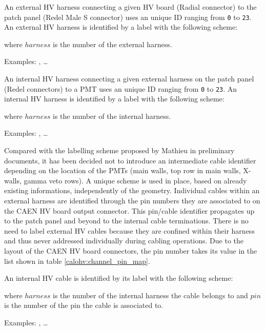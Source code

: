 \vskip 10pt An external HV harness connecting a given HV board (Radial
connector) to the patch panel (Redel  Male S connector) uses an unique
ID ranging from  \texttt{0} to \texttt{23}.  An external  HV harness is
identified by a label with the following scheme:
\begin{center}
 \end{center}
where \texttt{$harness$} is the number of the external harness.
\par\noindent Examples: , \dots
{}

\vskip 10pt An internal HV harness connecting a given external harness
on  the patch  panel (Redel  connectors) to  a PMT  uses an  unique ID
ranging from  \texttt{0} to  \texttt{23}.  An  internal HV  harness is
identified by a label with the following scheme:
\begin{center}
 \end{center}
where  \texttt{$harness$}  is  the  number of  the  internal  harness.
\par\noindent        Examples:       ,        \dots
{}

\vskip 10pt Compared with the  labelling scheme proposed by Mathieu in
preliminary  documents,  it  has  been decided  not  to  introduce  an
intermediate cable  identifier depending on  the location of  the PMTs
(main walls,  top row  in main  walls, X-walls,  gamma veto  rows).  A
unique  scheme   is  used   in  place,   based  on   already  existing
informations, independently of the geometry.  Individual cables within
an external  harness are identified  through the pin numbers  they are
associated to on  the CAEN HV board output  connector.  This pin/cable
identifier propagates up to the patch panel and beyond to the internal
cable  terminations.  There  is no  need to  label external  HV cables
because  they  are  confined  within  their  harness  and  thus  never
addressed individually  during cabling operations.  Due  to the layout
of the CAEN HV board connectors, the pin number takes its value in the
list shown in table \ref{calohv:channel_pin_map}.

\vskip 10pt An  internal HV cable is identified by its label with the
following scheme:
\begin{center}
 \end{center}
where \texttt{$harness$}  is the  number of  the internal  harness the
cable belongs to and \texttt{$pin$} is the number of the pin the cable
is  associated  to.   \par\noindent  Examples:  ,
\dots {}

